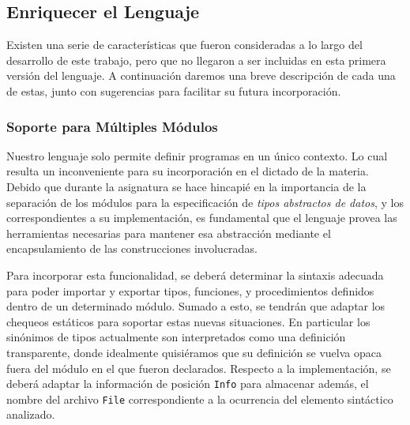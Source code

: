 \subsection{Enriquecer el Lenguaje}

Existen una serie de características que fueron consideradas a lo largo del desarrollo de este trabajo, pero que no llegaron a ser incluidas en esta primera versión del lenguaje.
A continuación daremos una breve descripción de cada una de estas, junto con sugerencias para facilitar su futura incorporación.

\subsubsection{Soporte para Múltiples Módulos}

Nuestro lenguaje solo permite definir programas en un único contexto.
Lo cual resulta un inconveniente para su incorporación en el dictado de la materia.
Debido que durante la asignatura se hace hincapié en la importancia de la separación de los módulos para la especificación de \textit{tipos abstractos de datos}, y los correspondientes a su implementación, es fundamental que el lenguaje provea las herramientas necesarias para mantener esa abstracción mediante el encapsulamiento de las construcciones involucradas.

Para incorporar esta funcionalidad, se deberá determinar la sintaxis adecuada para poder importar y exportar tipos, funciones, y procedimientos definidos dentro de un determinado módulo.
Sumado a esto, se tendrán que adaptar los chequeos estáticos para soportar estas nuevas situaciones.
En particular los sinónimos de tipos actualmente son interpretados como una definición transparente, donde idealmente quisiéramos que su definición se vuelva opaca fuera del módulo en el que fueron declarados.
Respecto a la implementación, se deberá adaptar la información de posición \lstinline[style = haskell]{Info} para almacenar además, el nombre del archivo \lstinline[style = haskell]{File} correspondiente a la ocurrencia del elemento sintáctico analizado.

